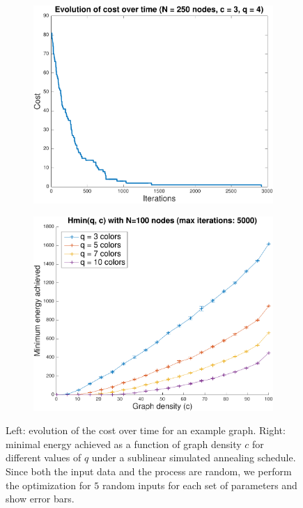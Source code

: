 \documentclass{article}
\begin{document}
  \begin{figure}[h]
    \centering
    \begin{subfigure}[t]{.49\linewidth}
      \centering
      \includegraphics[width=.8\linewidth]{figures/random-walk-example.pdf}
      \caption{}\label{Fig:random-walk-example}
    \end{subfigure}
    \begin{subfigure}[t]{.49\linewidth}
      \centering
      \includegraphics[width=.8\linewidth]{figures/cost-vs-graph-density.pdf}
      \caption{}\label{Fig:cost-vs-density}
    \end{subfigure}
    \caption{Left: evolution of the cost over time for an example graph. Right: minimal energy achieved as a function of graph density $c$ for different values of $q$ under a sublinear simulated annealing schedule. Since both the input data and the process are random, we perform the optimization for $5$ random inputs for each set of parameters and show error bars.}
  \end{figure}
\end{document}
